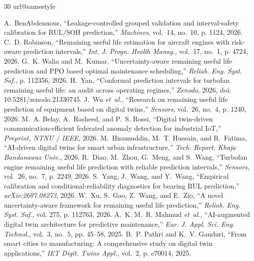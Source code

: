 \documentclass[conference,a4paper]{IEEEtran}
\begin{document}
\begin{thebibliography}{30}
\providecommand{\url}[1]{#1}
\csname url@samestyle\endcsname
\providecommand{\newblock}{\relax}
\providecommand{\bibinfo}[2]{#2}

A.~BenAbdennour, ``Leakage-controlled grouped validation and interval-safety calibration for RUL/SOH prediction,'' \emph{Machines}, vol.~14, no.~10, p. 1124, 2026.
C.~D. Robinson, ``Remaining useful life estimation for aircraft engines with risk-aware prediction intervals,'' \emph{Int. J. Progn. Health Manag.}, vol.~17, no.~1, p. 4724, 2026.
G.~K. Walia and M.~Kumar, ``Uncertainty-aware remaining useful life prediction and PPO based optimal maintenance scheduling,'' \emph{Reliab. Eng. Syst. Saf.}, p. 112356, 2026.
H.~Yan, ``Conformal prediction intervals for turbofan remaining useful life: an audit across operating regimes,'' \emph{Zenodo}, 2026, doi: 10.5281/zenodo.21330745.
J.~Wu \emph{et~al.}, ``Research on remaining useful life prediction of equipment based on digital twins,'' \emph{Sensors}, vol.~26, no.~4, p. 1240, 2026.
M.~A. Belay, A.~Rasheed, and P.~S. Rossi, ``Digital twin-driven communication-efficient federated anomaly detection for industrial IoT,'' \emph{Preprint, NTNU / IEEE}, 2026.
M.~Hisamuddin, M.~T. Hussain, and R.~Fatima, ``AI-driven digital twins for smart urban infrastructure,'' \emph{Tech. Report, Khaja Bandanawaz Univ.}, 2026.
R.~Diao, M.~Zhou, G.~Meng, and S.~Wang, ``Turbofan engine remaining useful life prediction with reliable prediction intervals,'' \emph{Sensors}, vol.~26, no.~7, p. 2249, 2026.
S.~Yang, J.~Wang, and Y.~Wang, ``Empirical calibration and conditional-reliability diagnostics for bearing RUL prediction,'' \emph{arXiv:2607.08273}, 2026.
W.~Xu, S.~Gao, Z.~Wang, and E.~Zio, ``A novel uncertainty-aware framework for remaining useful life prediction,'' \emph{Reliab. Eng. Syst. Saf.}, vol. 275, p. 112763, 2026.
A.~K. M.~R. Mahmud \emph{et~al.}, ``AI-augmented digital twin architecture for predictive maintenance,'' \emph{Eur. J. Appl. Sci. Eng. Technol.}, vol.~3, no.~5, pp. 45--58, 2025.
B.~P. Pathri and K.~V. Ganduri, ``From smart cities to manufacturing: A comprehensive study on digital twin applications,'' \emph{IET Digit. Twins Appl.}, vol.~2, p. e70014, 2025.

\end{thebibliography}
\end{document}
